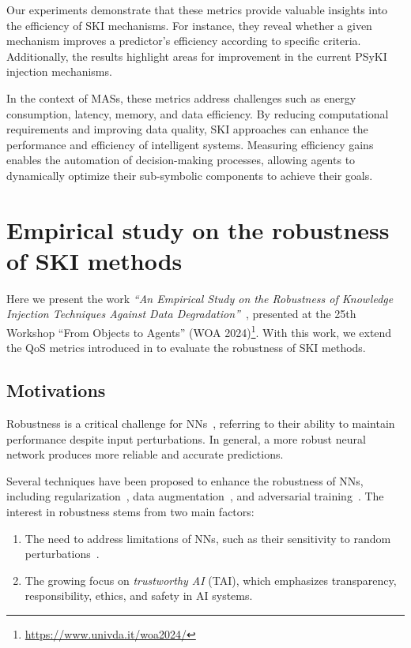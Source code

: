 %
Our experiments demonstrate that these metrics provide valuable insights into the efficiency of \gls{SKI} mechanisms.
%
For instance, they reveal whether a given mechanism improves a predictor's efficiency according to specific criteria.
%
Additionally, the results highlight areas for improvement in the current \gls{PSyKI} injection mechanisms.

%
In the context of \glspl{MAS}, these metrics address challenges such as energy consumption, latency, memory, and data efficiency.
%
By reducing computational requirements and improving data quality, \gls{SKI} approaches can enhance the performance and efficiency of intelligent systems.
%
Measuring efficiency gains enables the automation of decision-making processes, allowing agents to dynamically optimize their sub-symbolic components to achieve their goals.


\section[Empirical study on the robustness of SKI methods]{Empirical study on the robustness of \Gls{SKI} methods}\label{sec:empirical-study-on-the-robustness-of-ski-methods}
%
Here we present the work \emph{``An Empirical Study on the Robustness of Knowledge Injection Techniques Against Data Degradation''}~\cite{DBLP:conf/woa/RafanelliMACO24}, presented at the 25th Workshop ``From Objects to Agents'' (WOA 2024)\footnote{\url{https://www.univda.it/woa2024/}}.
%
With this work, we extend the \gls{QoS} metrics introduced in  to evaluate the robustness of \gls{SKI} methods.


\subsection{Motivations}\label{subsec:empirical-study-on-the-robustness-of-ski-methods-motivations}
%
Robustness is a critical challenge for \glspl{NN}~\cite{liu2018towards}, referring to their ability to maintain performance despite input perturbations.
%
In general, a more robust neural network produces more reliable and accurate predictions.

%
Several techniques have been proposed to enhance the robustness of \glspl{NN}, including regularization~\cite{prechelt2012early}, data augmentation~\cite{shorten2019survey}, and adversarial training~\cite{shrivastava2017learning}.
%
The interest in robustness stems from two main factors:
%
\begin{enumerate}
    \item The need to address limitations of \glspl{NN}, such as their sensitivity to random perturbations~\cite{franceschi2018robustness,szegedy2013intriguing}.
    \item The growing focus on \emph{trustworthy AI} (\gls{TAI}), which emphasizes transparency, responsibility, ethics, and safety in \gls{AI} systems.
\end{enumerate}

